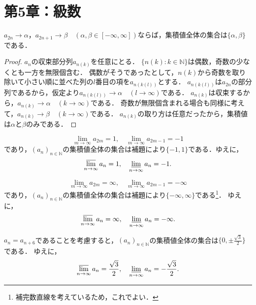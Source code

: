\part*{第5章：級数}




\begin{lemma}{}{}
    $a_{2n} \to \alpha$，$a_{2n+1} \to \beta$$\quad (\alpha,\beta \in [-\infty,\infty])$ならば，集積値全体の集合は$\{\alpha,\beta\}$である．
\end{lemma}
\begin{proof}
    $a_n$の収束部分列$a_{n(k)}$を任意にとる．
    $\{n(k):k \in \mathbb{N}\}$は偶数，奇数の少なくとも一方を無限個含む．
    偶数がそうであったとして，$n(k)$から奇数を取り除いて小さい順に並べた列の$l$番目の項を$a_{n(k(l))}$とする．
    $a_{n(k(l))}$は$a_{2n}$の部分列であるから，仮定より$a_{n(k(l))} \to \alpha \quad (l \to \infty)$である．
    $a_{n(k)}$は収束するから，$a_{n(k)} \to \alpha \quad (k \to \infty)$である．
    奇数が無限個含まれる場合も同様に考えて，$a_{n(k)} \to \beta \quad (k \to \infty)$である．
    $a_{n(k)}$の取り方は任意だったから，集積値は$\alpha$と$\beta$のみである．
\end{proof}

\begin{tanswer}
    \[
        \lim_{m \to \infty} a_{2m} = 1 , \quad \lim_{m \to \infty} a_{2m-1} = -1
    \]
    であり，$(a_n)_{n \in \mathbb{N}}$の集積値全体の集合は補題により$\{ -1 , 1 \}$である．ゆえに，
    \[
        \varlimsup_{n \to \infty} a_n = 1 , \quad \varliminf_{n \to \infty} a_n =-1.
    \]
\end{tanswer}


\begin{tanswer}
    \[
        \lim_{m \to \infty} a_{2m} = \infty , \quad \lim_{m \to \infty} a_{2m-1} = -\infty
    \]
    であり，$(a_n)_{n \in \mathbb{N}}$の集積値全体の集合は補題により$\{ -\infty , \infty \}$である\footnote{補完数直線を考えているため，これでよい．}．
    ゆえに，
    \[
        \varlimsup_{n \to \infty} a_n = \infty , \quad \varliminf_{n \to \infty} a_n =-\infty.
    \]
\end{tanswer}


\begin{tanswer}
    $ a_{n} = a_{n+6}$であることを考慮すると，$(a_n)_{n \in \mathbb{N}}$の集積値全体の集合は$\{ 0 , \pm \frac{\sqrt{3}}{2} \}$である．
    ゆえに，
    \[
        \varlimsup_{n \to \infty} a_n = \frac{\sqrt{3}}{2} , \quad \varliminf_{n \to \infty} a_n =-\frac{\sqrt{3}}{2}.
    \]
\end{tanswer}




